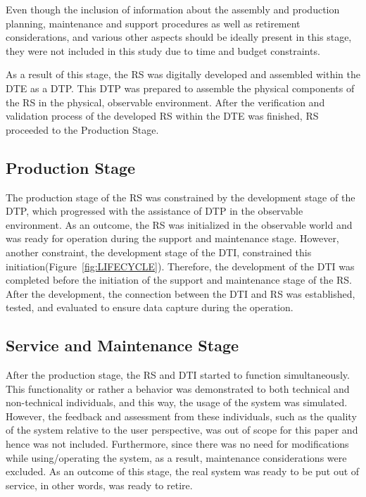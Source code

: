 \documentclass[conference]{IEEEtran}
\begin{document}
    Even though the inclusion of information about the assembly and production planning, maintenance and support procedures as well as retirement considerations,
    and various other aspects should be ideally present in this stage, they were not included in this study due to time and budget constraints. 

    As a result of this stage, the RS was digitally developed and assembled within the DTE as a DTP. This DTP was prepared to assemble the physical components of the RS in the physical,
    observable environment. After the verification and validation process of the developed RS within the DTE was finished, RS proceeded to the Production Stage.

    \subsection{Production Stage}
    The production stage of the RS was constrained by the development stage of the DTP, which progressed with the assistance of  DTP in the observable environment.  
    As an outcome, the RS was initialized in the observable world and was ready for operation during the support and maintenance stage. However, another constraint, the development stage of the DTI, 
    constrained this initiation(Figure~\ref{fig:LIFECYCLE}). Therefore, the development of the DTI was completed before the initiation of the support and maintenance stage of the RS. 
    After the development, the connection between the DTI and RS was established, tested, and evaluated to ensure data capture during the operation.

    \subsection{Service and Maintenance Stage}
    After the production stage, the RS and DTI started to function simultaneously. This functionality or rather a behavior was 
    demonstrated to both technical and non-technical individuals, and this way, the usage of the system was simulated. 
    However, the feedback and assessment from these individuals, such as the quality of the system relative to the user perspective, was out of 
    scope for this paper and hence was not included.  Furthermore, since there was no need for modifications while using/operating the system, 
    as a result, maintenance considerations were excluded. As an outcome of this stage, the real system was ready to be put out of service, in other words, was ready to retire.
\end{document}
